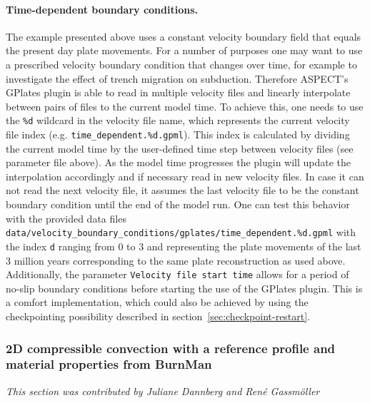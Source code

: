 \documentclass{article}
\newcommand{\aspect}{\textsc{ASPECT}}
\begin{document}
\paragraph{Time-dependent boundary conditions.}
\label{sec:time-dependent-gplates-velocities}
The example presented above uses a constant velocity boundary field that
equals the present day plate movements. For a number of purposes one may want to
use a prescribed velocity boundary condition that changes over time, for example
to investigate the effect of trench migration on subduction. Therefore \aspect{}'s
GPlates plugin is able to read in multiple velocity files and linearly interpolate
between pairs of files to the current model time. To achieve this, one needs
to use the \texttt{\%d} wildcard in the velocity file name, which represents the current
velocity file index (e.g. \texttt{time\_dependent.\%d.gpml}). This index is
calculated by dividing the current model time by the user-defined time step
between velocity files (see parameter file above). As the model time progresses
the plugin will update the interpolation accordingly and if necessary read in
new velocity files. In case it can not read the next velocity file, it assumes
the last velocity file to be the constant boundary condition until the end of
the model run. One can test this behavior with the provided data files
\texttt{data/velocity\_boundary\_conditions/gplates/time\_dependent.\%d.gpml}
with the index \texttt{d} ranging from 0 to 3 and representing the plate movements of
the last 3 million years corresponding to the same plate reconstruction as used
above. Additionally, the parameter \texttt{Velocity file start time} allows for
a period of no-slip boundary conditions before starting the use of the GPlates plugin.
This is a comfort implementation, which could also be achieved by using the checkpointing
possibility described in section~\ref{sec:checkpoint-restart}. 

\subsubsection{2D compressible convection with a reference profile and material properties from BurnMan}
\label{sec:cookbooks-burnman}
\textit{This section was contributed by Juliane Dannberg and Ren{\'e} Gassm{\"o}ller}
\end{document}
